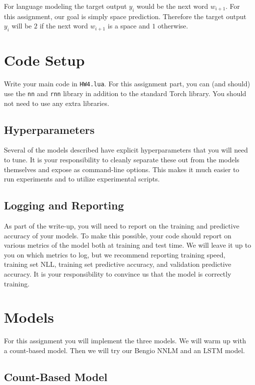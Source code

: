 \documentclass[11pt]{article}
\begin{document}
For language modeling the target output $y_i$ would be the next word
$w_{i+1}$.  For this assignment, our goal is simply space
prediction. Therefore the target output $y_i$ will be $2$ if the next
word $w_{i+1}$ is a space and $1$ otherwise.

\section{Code Setup}

Write your main code in \texttt{HW4.lua}. For this assignment part,
you can (and should) use the \texttt{nn} and \texttt{rnn} library in addition to the
standard Torch library. You should not need to use any extra libraries.

\subsection{Hyperparameters}

Several of the models described have explicit hyperparameters that you will 
need to tune. It is your responsibility to cleanly separate these out from 
the models themselves and expose as command-line options. This makes it much 
easier to run experiments and to utilize experimental scripts. 

\subsection{Logging and Reporting}

As part of the write-up, you will need to report on the training and
predictive accuracy of your models. To make this possible, your code
should report on various metrics of the model both at training and
test time. We will leave it up to you on which metrics to log, but we
recommend reporting training speed, training set NLL, training set
predictive accuracy, and validation predictive accuracy. It is your
responsibility to convince us that the model is correctly training.

\section{Models}

For this assignment you will implement the three models. We will warm
up with a count-based model. Then we will
try our Bengio NNLM and an LSTM model. 


\subsection{Count-Based Model}
\end{document}
